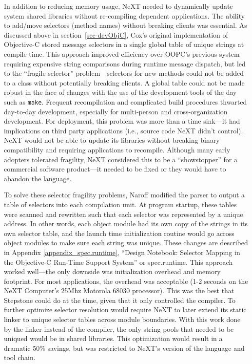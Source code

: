 \documentclass[acmsmall,screen]{acmart}
\begin{document}
In addition to reducing memory usage, NeXT needed to dynamically update system shared libraries without re-compiling dependent applications. The ability to add/move selectors (method names) without breaking clients was essential. As discussed above in section~\ref{sec-devObjC}, Cox's original implementation of Objective-C stored message selectors in a single global table of unique strings at compile time. This approach improved efficiency over OOPC's previous system requiring expensive string comparisons during runtime message dispatch, but led to the ``fragile selector'' problem---selectors for new methods could not be added to a class without potentially breaking clients. A global table could not be made robust in the face of changes with the use of the development tools of the day such as \verb$make$. Frequent recompilation and complicated build procedures thwarted day-to-day development, especially for multi-person and cross-organization development. For deployment, this problem was more than a time sink---it had implications on third party applications (i.e., source code NeXT didn't control). NeXT would not be able to update its libraries without breaking binary compatibility and requiring applications to recompile. Although many early adopters tolerated fragility, NeXT considered this to be a ``showstopper'' for a commercial software product---it needed to be fixed or they would have to abandon the language.

To solve these selector fragility problems, Naroff modified the parser to output a table of selectors into each compilation unit. At program startup, these tables were scanned and rewritten such that each selector was represented by a unique address. In other words, each object module had its own copy of the strings in its own selector table, and the launch time initialization routine would go across object modules to make sure each string was unique. These changes are described in Appendix \ref{appendix_spec.runtime}, ``Design Notebook: Selector Mapping in the Objective-C Run-Time Support System'' or spec.runtime. This approach worked well---the only downside was initialization overhead and memory footprint. For most applications, the overhead was acceptable (1-2 seconds on the NeXT Computer's 25Mhz Motorola 68030 processor). This was the best that Stepstone could do at the time, given that it only controlled the compiler. To further optimize selector resolution would require NeXT to later extend its static linker to unique selector tables across module boundaries. With this work done by the linker instead of the compiler, the only string pools that needed to be uniqued would be in shared libraries. This optimization would result in a dramatic 50\% savings, but was restricted to NeXT's version of the language and tool chain.
\end{document}
